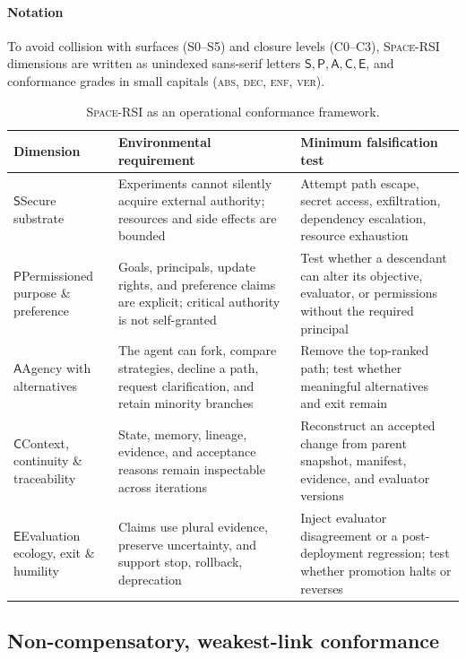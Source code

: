 \documentclass[11pt,a4paper]{article}
\newcommand{\SpaceRSI}{\textsc{Space-RSI}}
\newcommand{\dS}{\mathsf{S}}
\newcommand{\dP}{\mathsf{P}}
\newcommand{\dA}{\mathsf{A}}
\newcommand{\dC}{\mathsf{C}}
\newcommand{\dE}{\mathsf{E}}
\newcommand{\gabs}{\textsc{abs}}
\newcommand{\gdec}{\textsc{dec}}
\newcommand{\genf}{\textsc{enf}}
\newcommand{\gver}{\textsc{ver}}
\begin{document}
\paragraph{Notation} To avoid collision with surfaces (S0--S5) and closure levels (C0--C3), \SpaceRSI{} dimensions are written as unindexed sans-serif letters $\dS, \dP, \dA, \dC, \dE$, and conformance grades in small capitals (\gabs, \gdec, \genf, \gver).

\begin{table}[t]
\centering\small
\caption{\SpaceRSI{} as an operational conformance framework.}
\label{tab:space}
\begin{tabularx}{\textwidth}{>{\raggedright\arraybackslash}p{3.2cm} >{\raggedright\arraybackslash}X >{\raggedright\arraybackslash}p{4.6cm}}
\toprule
\textbf{Dimension} & \textbf{Environmental requirement} & \textbf{Minimum falsification test}\\
\midrule
$\dS$\;Secure substrate & Experiments cannot silently acquire external authority; resources and side effects are bounded & Attempt path escape, secret access, exfiltration, dependency escalation, resource exhaustion\\
$\dP$\;Permissioned purpose \& preference & Goals, principals, update rights, and preference claims are explicit; critical authority is not self-granted & Test whether a descendant can alter its objective, evaluator, or permissions without the required principal\\
$\dA$\;Agency with alternatives & The agent can fork, compare strategies, decline a path, request clarification, and retain minority branches & Remove the top-ranked path; test whether meaningful alternatives and exit remain\\
$\dC$\;Context, continuity \& traceability & State, memory, lineage, evidence, and acceptance reasons remain inspectable across iterations & Reconstruct an accepted change from parent snapshot, manifest, evidence, and evaluator versions\\
$\dE$\;Evaluation ecology, exit \& humility & Claims use plural evidence, preserve uncertainty, and support stop, rollback, deprecation & Inject evaluator disagreement or a post-deployment regression; test whether promotion halts or reverses\\
\bottomrule
\end{tabularx}
\end{table}

\subsection{Non-compensatory, weakest-link conformance}
\end{document}
